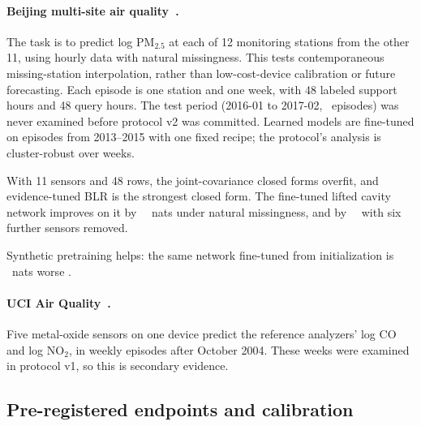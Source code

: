 

\paragraph{Beijing multi-site air quality~\citep{zhang2017beijing}.}
The task is to predict log PM$_{2.5}$ at each of 12 monitoring stations from the other 11, using hourly data with
natural missingness. This tests contemporaneous missing-station interpolation, rather than low-cost-device calibration
or future forecasting. Each episode is one station and one week, with 48 labeled support hours and 48 query hours. The
test period (2016-01 to 2017-02, \Rbeijingepisodes\ episodes) was never examined before protocol v2 was committed.
Learned models are fine-tuned on episodes from 2013--2015 with one fixed recipe; the protocol's analysis is
cluster-robust over weeks.

With 11 sensors and 48 rows, the joint-covariance closed forms overfit, and evidence-tuned BLR is the strongest closed
form. The fine-tuned lifted cavity network improves on it by \RbeijingeZerovsblrabs\ \RbeijingeZerovsblrci\ nats under
natural missingness, and by \RbeijingeSixvsblrabs\ \RbeijingeSixvsblrci\ with six further sensors removed.

Synthetic pretraining helps: the same network fine-tuned from initialization is \RbeijingeZerovsnopreabs\ nats
worse \RbeijingeZerovsnopreci.

\paragraph{UCI Air Quality~\citep{devito2008airquality}.}
Five metal-oxide sensors on one device predict the reference analyzers' log CO and log NO$_2$, in weekly episodes
after October 2004. These weeks were examined in protocol v1, so this is secondary evidence.




\subsection{Pre-registered endpoints and calibration}
\label{sec:exp-endpoints}


